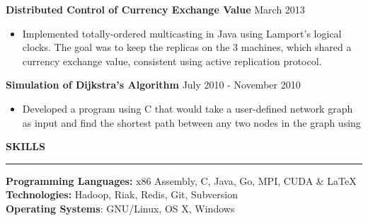 \documentclass[10pt, a4paper]{article}
\begin{document}
{\bf Distributed Control of Currency Exchange Value} \hfill March 2013
\begin{itemize}
    \item Implemented totally-ordered multicasting in Java using Lamport's logical clocks. The goal was to keep the replicas on the 3 machines, which shared a currency exchange value, consistent using active replication protocol. %
\end{itemize}
{\bf Simulation of Dijkstra's Algorithm} \hfill July 2010 - November 2010
\begin{itemize}
    \item Developed a program using C that would take a user-defined network graph as input and find the shortest path between any two nodes in the graph using %
\end{itemize}

\MakeUppercase{\bf Skills}
\smallskip
\hrule
{\bf Programming Languages:} x86 Assembly, C, Java, Go, MPI, CUDA \& \LaTeX\ \\
{\bf Technologies:} Hadoop, Riak, Redis, Git, Subversion\\
{\bf Operating Systems}: GNU/Linux, OS X, Windows\\
\end{document}
